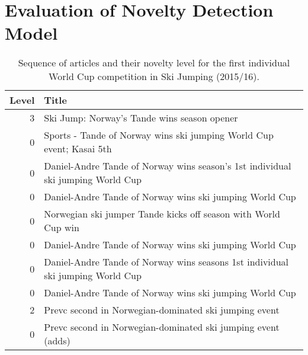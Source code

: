 \documentclass{acm_proc_article-sp}
\begin{document}
\onecolumn

\appendix
\section{Evaluation of Novelty Detection Model}\label{appendix:streams} %

\begin{table}[!htb]
	\centering
    \begin{tabular}{|r|l|}
    	\hline
    	Level & Title \\
        \hline
        3 & Ski Jump: Norway's Tande wins season opener \\
        0 & Sports - Tande of Norway wins ski jumping World Cup event; Kasai 5th \\
        0 & Daniel-Andre Tande of Norway wins season's 1st individual ski jumping World Cup \\
        0 & Daniel-Andre Tande of Norway wins ski jumping World Cup \\
        0 & Norwegian ski jumper Tande kicks off season with World Cup win \\
        0 & Daniel-Andre Tande of Norway wins ski jumping World Cup \\
        0 & Daniel-Andre Tande of Norway wins seasons 1st individual ski jumping World Cup \\
        0 & Daniel-Andre Tande of Norway wins ski jumping World Cup \\
        2 & Prevc second in Norwegian-dominated ski jumping event\\
		0 & Prevc second in Norwegian-dominated ski jumping event (adds) \\
        \hline
    \end{tabular}
    \caption{Sequence of articles and their novelty level for the first individual World Cup competition in Ski Jumping (2015/16).}
	\label{tab:tande}
\end{table}
%
\end{document}

